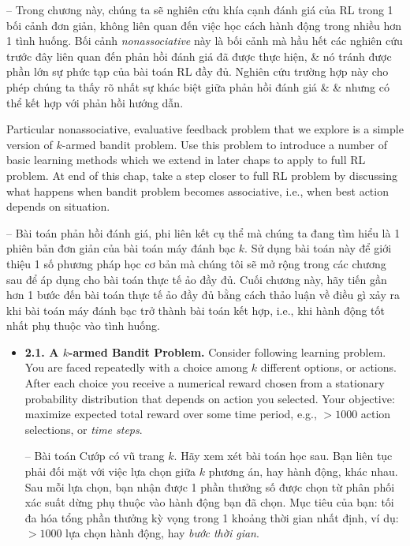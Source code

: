 \documentclass{article}
\begin{document}
\begin{itemize}
    -- Trong chương này, chúng ta sẽ nghiên cứu khía cạnh đánh giá của RL trong 1 bối cảnh đơn giản, không liên quan đến việc học cách hành động trong nhiều hơn 1 tình huống. Bối cảnh {\it nonassociative} này là bối cảnh mà hầu hết các nghiên cứu trước đây liên quan đến phản hồi đánh giá đã được thực hiện, \& nó tránh được phần lớn sự phức tạp của bài toán RL đầy đủ. Nghiên cứu trường hợp này cho phép chúng ta thấy rõ nhất sự khác biệt giữa phản hồi đánh giá \& \& nhưng có thể kết hợp với phản hồi hướng dẫn.

    Particular nonassociative, evaluative feedback problem that we explore is a simple version of $k$-armed bandit problem. Use this problem to introduce a number of basic learning methods which we extend in later chaps to apply to full RL problem. At end of this chap, take a step closer to full RL problem by discussing what happens when bandit problem becomes associative, i.e., when best action depends on situation.

    -- Bài toán phản hồi đánh giá, phi liên kết cụ thể mà chúng ta đang tìm hiểu là 1 phiên bản đơn giản của bài toán máy đánh bạc $k$. Sử dụng bài toán này để giới thiệu 1 số phương pháp học cơ bản mà chúng tôi sẽ mở rộng trong các chương sau để áp dụng cho bài toán thực tế ảo đầy đủ. Cuối chương này, hãy tiến gần hơn 1 bước đến bài toán thực tế ảo đầy đủ bằng cách thảo luận về điều gì xảy ra khi bài toán máy đánh bạc trở thành bài toán kết hợp, i.e., khi hành động tốt nhất phụ thuộc vào tình huống.
    \begin{itemize}
        \item {\bf2.1. A $k$-armed Bandit Problem.} Consider following learning problem. You are faced repeatedly with a choice among $k$ different options, or actions. After each choice you receive a numerical reward chosen from a stationary probability distribution that depends on action you selected. Your objective: maximize expected total reward over some time period, e.g., $> 1000$ action selections, or {\it time steps}.

        -- {\sf Bài toán Cướp có vũ trang $k$.} Hãy xem xét bài toán học sau. Bạn liên tục phải đối mặt với việc lựa chọn giữa $k$ phương án, hay hành động, khác nhau. Sau mỗi lựa chọn, bạn nhận được 1 phần thưởng số được chọn từ phân phối xác suất dừng phụ thuộc vào hành động bạn đã chọn. Mục tiêu của bạn: tối đa hóa tổng phần thưởng kỳ vọng trong 1 khoảng thời gian nhất định, ví dụ: $> 1000$ lựa chọn hành động, hay {\it bước thời gian}.


\end{itemize}
\end{itemize}
\end{document}
